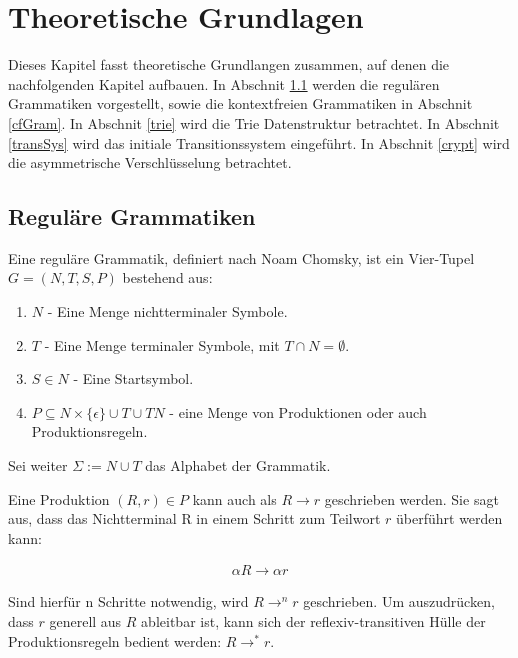 \documentclass[a4paper,12pt]{report}
\begin{document}
\newpage
\thispagestyle{empty}
\mbox{}
\chapter{Theoretische Grundlagen}
\label{theo}


Dieses Kapitel fasst theoretische Grundlangen zusammen, auf denen die nachfolgenden Kapitel aufbauen. In Abschnit \ref{regGram} werden die regulären Grammatiken vorgestellt, sowie die kontextfreien Grammatiken in Abschnit \ref{cfGram}. In Abschnit \ref{trie} wird die Trie Datenstruktur betrachtet. In Abschnit \ref{transSys} wird das initiale Transitionssystem eingeführt. In Abschnit \ref{crypt} wird die asymmetrische Verschlüsselung betrachtet.

\section{Reguläre Grammatiken}
\label{regGram}
Eine reguläre Grammatik, definiert nach Noam Chomsky, ist ein Vier-Tupel 
$G = (N,T,S,P)$ bestehend aus:

\begin{enumerate}
\item $N$ - Eine Menge nichtterminaler Symbole.
\item $T$ - Eine Menge terminaler Symbole, mit $T\cap N = \emptyset$.
\item $S\in N$ - Eine Startsymbol.
\item $P \subseteq N\times \{\epsilon\}\cup T \cup TN$ - eine Menge von Produktionen oder auch Produktionsregeln.
\end{enumerate}

Sei weiter $\Sigma := N \cup T$ das Alphabet der Grammatik.

Eine Produktion $(R,r)\in P$ kann auch als $R\rightarrow r$ geschrieben werden.
Sie sagt aus, dass das Nichtterminal R in einem Schritt zum Teilwort $r$ überführt werden kann:

\begin{eqnarray}
  \alpha R \rightarrow \alpha r
\end{eqnarray}

Sind hierfür n Schritte notwendig, wird $R \rightarrow^n r$ geschrieben. Um auszudrücken, dass $r$ generell aus $R$ ableitbar ist, kann sich der reflexiv-transitiven Hülle der Produktionsregeln bedient werden: $R \rightarrow ^* r$.
\end{document}
